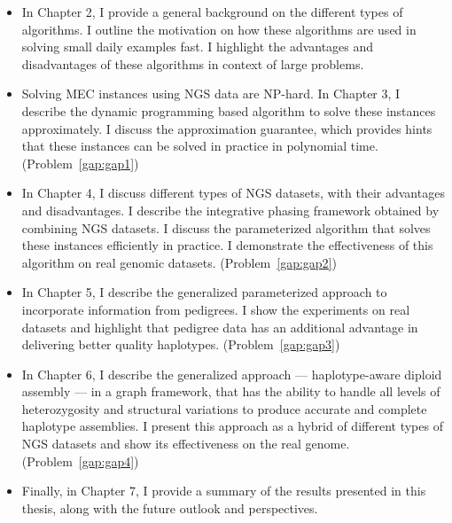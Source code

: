 \begin{itemize}
 \item In Chapter 2, I provide a general background on the different types of algorithms. I outline the motivation on how these algorithms are used in solving small daily examples fast. 
 I highlight the advantages and disadvantages of these algorithms in context of large problems.
 \item Solving MEC instances using NGS data are NP-hard. In Chapter 3, I describe the dynamic programming based algorithm to solve these instances approximately.
 I discuss the approximation guarantee, which provides hints that these instances can be solved in practice in polynomial time. (Problem~\ref{gap:gap1})
  \item In Chapter 4, I discuss different types of NGS datasets, with their advantages and disadvantages. I describe the integrative phasing framework obtained by combining NGS datasets. I discuss the parameterized algorithm that solves these instances efficiently in practice. 
  I demonstrate the effectiveness of this algorithm on real genomic datasets. (Problem~\ref{gap:gap2})
 \item In Chapter 5, I describe the generalized parameterized approach to incorporate information from pedigrees. I show the experiments on real datasets and highlight that pedigree data has an additional advantage in delivering better quality haplotypes. (Problem~\ref{gap:gap3})
 \item In Chapter 6, I describe the generalized approach --- haplotype-aware diploid assembly --- in a graph framework, that has the ability to handle all levels of heterozygosity and structural variations to produce accurate and complete haplotype assemblies.
 I present this approach as a hybrid of different types of NGS datasets and show its effectiveness on the real genome. (Problem~\ref{gap:gap4})
 \item Finally, in Chapter 7, I provide a summary of the results presented in this thesis, along with the future outlook and perspectives.
\end{itemize}

